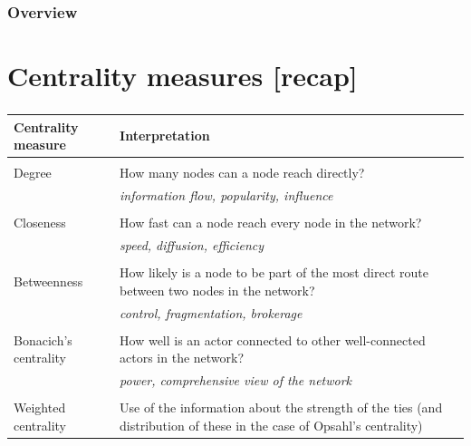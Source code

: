 \documentclass[8pt]{beamer}
\begin{document}
\begin{frame}
\frametitle{Overview}
\tableofcontents[hideallsubsections]
\end{frame}



\section{Centrality measures [recap]}

\bgroup
{}
\begin{frame}[plain]{}
\begin{center}
\color{white}{\Huge\insertsection}
\end{center}
\end{frame}
\egroup


\begin{frame}
\frametitle{\insertsection}
\framesubtitle{\insertsubsection}

\small
\begin{table}
\begin{tabular}{p{3cm}p{7.5cm}}
\toprule
\textbf{Centrality measure} 	&	\textbf{Interpretation} \\
\hline
\\
Degree 		&	How many nodes can a node reach directly?\\
			&	\textit{\color{blue}information flow, popularity, influence}\\
\\
Closeness        &	    How fast can a node reach every node in the network?\\
			&	\textit{\color{blue}speed, diffusion, efficiency}\\
\\
Betweenness        &	How likely is a node to be part of the most direct route between two nodes in the network?\\
			&	\textit{\color{blue}control, fragmentation, brokerage}\\
\\
Bonacich's centrality 	&	How well is an actor connected to other well-connected actors in the network?\\ 
			&	\textit{\color{blue}power, comprehensive view of the network}\\
\\
Weighted centrality     & Use of the information about the strength of the ties (and distribution of these in the case of Opsahl's centrality)\\
\bottomrule
\end{tabular}
\end{table}
\end{frame}
\end{document}
